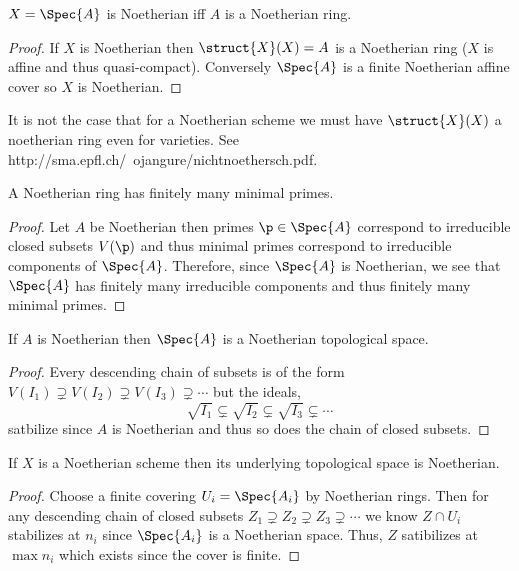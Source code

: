 \documentclass[12pt]{article}
\begin{document}
\begin{cor}
$X = \Spec{A}$ is Noetherian iff $A$ is a Noetherian ring.
\end{cor}

\begin{proof}
If $X$ is Noetherian then $\struct{X}(X) = A$ is a Noetherian ring ($X$ is affine and thus quasi-compact). Conversely $\Spec{A}$ is a finite Noetherian affine cover so $X$ is Noetherian.
\end{proof}

\begin{rmk}
It is not the case that for a Noetherian scheme we must have $\struct{X}(X)$ a noetherian ring even for varieties. See http://sma.epfl.ch/~ojangure/nichtnoethersch.pdf. 
\end{rmk}

\begin{cor}
A Noetherian ring has finitely many minimal primes.
\end{cor}

\begin{proof}
Let $A$ be Noetherian then primes $\p \in \Spec{A}$ correspond to irreducible closed subsets $V(\p)$ and thus minimal primes correspond to irreducible components of $\Spec{A}$. Therefore, since $\Spec{A}$ is Noetherian, we see that $\Spec{A}$ has finitely many irreducible components and thus finitely many minimal primes. 
\end{proof}

\begin{lemma}
If $A$ is Noetherian then $\Spec{A}$ is a Noetherian topological space.
\end{lemma}

\begin{proof}
Every descending chain of subsets is of the form $V(I_1) \supsetneq V(I_2) \supsetneq V(I_3) \supsetneq \cdots$ but the ideals,
\[ \sqrt{I_1} \subsetneq \sqrt{I_2} \subsetneq \sqrt{I_3} \subsetneq \cdots \]
satbilize since $A$ is Noetherian and thus so does the chain of closed subsets.
\end{proof}

\begin{lemma}
If $X$ is a Noetherian scheme then its underlying topological space is Noetherian.
\end{lemma}

\begin{proof}
Choose a finite covering $U_i = \Spec{A_i}$ by Noetherian rings. Then for any descending chain of closed subsets $Z_1 \supsetneq Z_2 \supsetneq Z_3 \supsetneq \cdots$ we know $Z \cap U_i$ stabilizes at $n_i$ since $\Spec{A_i}$ is a Noetherian space. Thus, $Z$ satibilizes at $\max{n_i}$ which exists since the cover is finite. 
\end{proof}
\end{document}
